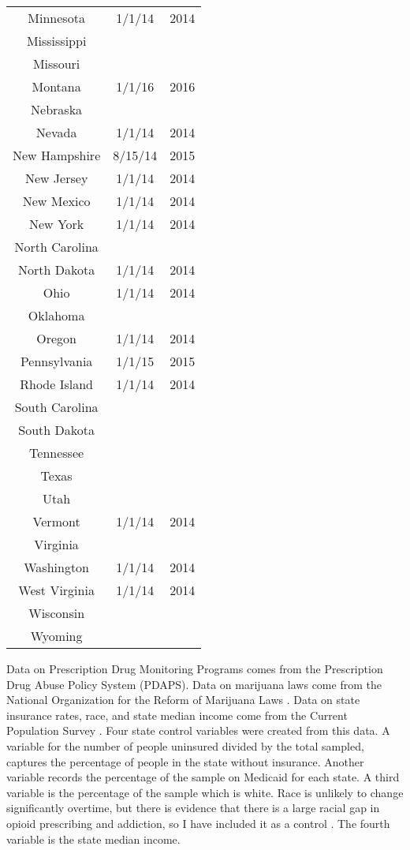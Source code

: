 \documentclass[11pt]{article}
\begin{document}
\begin{table}
\begin{tabular}{ccc}
 Minnesota & 1/1/14 & 2014\\
 Mississippi &&\\
 Missouri &&\\
 Montana & 1/1/16 & 2016\\
 Nebraska &&\\
 Nevada & 1/1/14 & 2014\\
 New Hampshire & 8/15/14 & 2015\\
 New Jersey & 1/1/14 & 2014\\
 New Mexico & 1/1/14 & 2014\\
 New York & 1/1/14 & 2014\\
 North Carolina &&\\
 North Dakota & 1/1/14 & 2014\\
 Ohio & 1/1/14 & 2014\\
 Oklahoma &&\\
 Oregon & 1/1/14 & 2014\\
 Pennsylvania & 1/1/15 & 2015\\
 Rhode Island & 1/1/14 & 2014\\
 South Carolina &&\\
 South Dakota &&\\
 Tennessee &&\\
 Texas &&\\
 Utah &&\\
 Vermont &1/1/14 & 2014\\
 Virginia &&\\
 Washington & 1/1/14 & 2014\\
 West Virginia & 1/1/14 & 2014\\
 Wisconsin &&\\
 Wyoming &&\\ 
\hline
\end{tabular}
\end{table}

\cleardoublepage

Data on Prescription Drug Monitoring Programs comes from the Prescription Drug Abuse Policy System (PDAPS). Data on marijuana laws come from the National Organization for the Reform of Marijuana Laws \citep{NORML}.  Data on state insurance rates, race, and state median income come from the Current Population Survey \citep{U.S.CensusBureau2016}.  Four state control variables were created from this data.  A variable for the number of people uninsured divided by the total sampled, captures the percentage of people in the state without insurance.  Another variable records the percentage of the sample on Medicaid for each state.  A third variable is the percentage of the sample which is white.  Race is unlikely to change significantly overtime, but there is evidence that there is a large racial gap in opioid prescribing and addiction, so I have included it as a control \citep{Johnson2016}.  The fourth variable is the state median income.  
\end{document}
